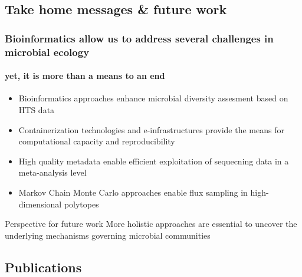 \documentclass{beamer}
\begin{document}
   \fi 



   \begin{darkframes}
      \section{
         Take home messages \& future work
      }
   \end{darkframes}

   \begin{frame}
      \frametitle{Bioinformatics allow us to address several challenges in microbial ecology}
      \framesubtitle{yet, it is more than a means to an end}

      \begin{itemize}

         \item \footnotesize Bioinformatics approaches enhance microbial diversity assesment based on HTS data
 
         \item \footnotesize Containerization technologies and e-infrastructures provide the means for computational capacity and reproducibility

         \item \footnotesize High quality metadata enable efficient exploitation of sequecning data in a meta-analysis level
         
         \item \footnotesize Markov Chain Monte Carlo approaches enable flux sampling in high-dimensional polytopes 

      \end{itemize}

      \begin{block}{Perspective for future work}
         More holistic approaches are essential to uncover the underlying mechanisms governing microbial
         communities
      \end{block}

   \end{frame}





   \begin{darkframes}
      \section{Publications}
   \end{darkframes}
\end{document}

